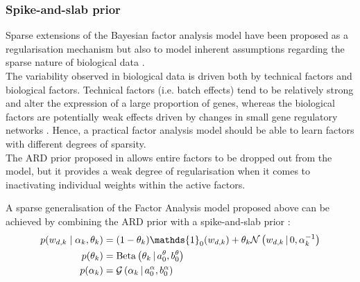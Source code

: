 
\subsubsection{Spike-and-slab prior} \label{section_spikeslab}

Sparse extensions of the Bayesian factor analysis model have been proposed as a regularisation mechanism but also to model inherent assumptions regarding the sparse nature of biological data \cite{Stegle2012,Gao2013}.\\
The variability observed in biological data is driven both by technical factors and biological factors. Technical factors (i.e. batch effects) tend to be relatively strong and alter the expression of a large proportion of genes, whereas the biological factors are potentially weak effects driven by changes in small gene regulatory networks \cite{Gao2013}. Hence, a practical factor analysis model should be able to learn factors with different degrees of sparsity.\\
The ARD prior proposed in  allows entire factors to be dropped out from the model, but it provides a weak degree of regularisation when it comes to inactivating individual weights within the active factors.

A sparse generalisation of the Factor Analysis model proposed above can be achieved by combining the ARD prior with a spike-and-slab prior \cite{Mitchell1988,Titsias2011}:
\begin{align}
	p(w_{d,k} \mid \alpha_k,\theta_k) &= (1-\theta_k) \mathds{1}_0(w_{d,k}) + \theta_k \Ndist{w_{d,k}}{0, \alpha_k^{-1}} \\
	p(\theta_k) &= \Bdist{\theta_k}{a_0^\theta,b_0^\theta} \\
	p(\alpha_k) &= \Gdist{\alpha_k}{a_0^\alpha, b_0^\alpha}
\end{align}

